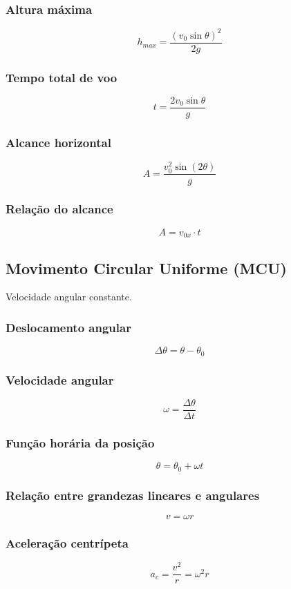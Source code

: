 \documentclass[a4paper,12pt]{article}
\begin{document}
\subsubsection{Altura máxima}
\[
h_{max} = \frac{(v_0 \sin\theta)^2}{2g}
\]

\subsubsection{Tempo total de voo}
\[
t = \frac{2 v_0 \sin\theta}{g}
\]

\subsubsection{Alcance horizontal}
\[
A = \frac{v_0^2 \sin(2\theta)}{g}
\]

\subsubsection{Relação do alcance}
\[
A = v_{0x} \cdot t
\]

\subsection{Movimento Circular Uniforme (MCU)}

Velocidade angular constante.

\subsubsection{Deslocamento angular}
\[
\Delta \theta = \theta - \theta_0
\]

\subsubsection{Velocidade angular}
\[
\omega = \frac{\Delta \theta}{\Delta t}
\]

\subsubsection{Função horária da posição}
\[
\theta = \theta_0 + \omega t
\]

\subsubsection{Relação entre grandezas lineares e angulares}
\[
v = \omega r
\]

\subsubsection{Aceleração centrípeta}
\[
a_c = \frac{v^2}{r} = \omega^2 r
\]
\end{document}

